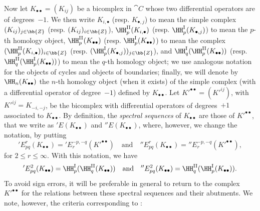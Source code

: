 \begin{env}[11.3.5]
\label{0.11.3.5}
Now let $K_{\bullet\bullet} = (K_{ij})$ be a bicomplex in $\cat{C}$ whose two differential operators are of degrees~$-1$.
We then write $K_{i,\bullet}$ (resp. $K_{\bullet,j}$) to mean the simple complex $(K_{ij})_{j\in\bb{Z}}$ (resp. $(K_{ij})_{i\in\bb{Z}}$), $\HH_{p}^\mathrm{II}(K_{i, \bullet})$ (resp. $\HH_{p}^\mathrm{I}(K_{\bullet, j})$) to mean the $p$-th homology object, $\HH_{p}^\mathrm{II}(K_{\bullet\bullet})$ (resp. $\HH_{p}^\mathrm{I}(K_{\bullet\bullet})$) to mean the complex $(\HH_{p}^\mathrm{II}(K_{i, \bullet}))_{i \in\bb{Z}}$ (resp. $(\HH_{p}^\mathrm{I}(K_{\bullet, j}))_{j \in\bb{Z}}$), and $\HH_q^\mathrm{I}(\HH_{p}^\mathrm{II}(K_{\bullet\bullet}))$ (resp. $\HH_q^\mathrm{II}(\HH_{p}^\mathrm{I}(K_{\bullet\bullet}))$) to mean the $q$-th homology object;
we use analogous notation for the objects of cycles and objects of boundaries;
finally, we will denote by $\HH_n(K_{\bullet\bullet})$ the $n$-th homology object (when it exists) of the simple complex (with a differential operator of degree~$-1$) defined by $K_{\bullet\bullet}$.
Let $K'^{\bullet\bullet}=(K'^{ij})$, with $K'^{ij}=K_{-i,-j}$, be the bicomplex with differential operators of degrees~$+1$ associated to $K_{\bullet\bullet}$.
By definition, the \emph{spectral sequences} of $K_{\bullet\bullet}$ are those of $K'^{\bullet\bullet}$, that we write as $'E(K_{\bullet\bullet})$ and $''E(K_{\bullet\bullet})$, where, however, we change the notation, by putting
\[
  'E_{pq}^{r}(K_{\bullet\bullet})
  = 'E_{r}^{-p,-q}(K'^{\bullet\bullet})
  \quad\text{and}\quad
  ''E_{pq}^{r}(K_{\bullet\bullet})
  = ''E_{r}^{-p,-q}(K'^{\bullet\bullet}), 
\]
for $2\leq r \leq \infty$.
With this notation, we have
\[
  'E_{pq}^{2}(K_{\bullet\bullet})
  = \HH_{p}^\mathrm{I}(\HH_{q}^\mathrm{II}(K_{\bullet\bullet}))
  \quad\text{and}\quad
  ''E_{pq}^{2}(K_{\bullet\bullet})
  = \HH_{q}^\mathrm{II}(\HH_{p}^\mathrm{I}(K_{\bullet\bullet})).
\]
To avoid sign errors, it will be preferable in general to return to the complex $K'^{\bullet\bullet}$ for the relations between these spectral sequences and their abutments.
We note, however, the criteria corresponding to :
\end{env}

